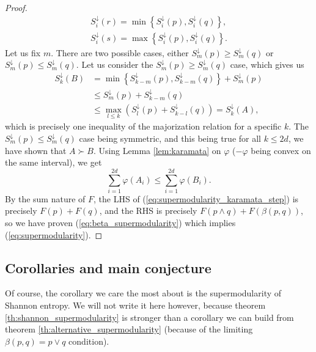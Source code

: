 \begin{proof}
    \begin{gather}
        S^\downarrow_i (r) = \min \left\{S^\downarrow_i (p), S^\downarrow_i (q)\right\}, \\
        S^\downarrow_i (s) = \max \left\{S^\downarrow_i (p), S^\downarrow_i (q)\right\}.
    \end{gather} 
    Let us fix $m$. There are two possible cases, either $S^\downarrow_m (p) \geq S^\downarrow_m (q)$ or $S^\downarrow_m (p) \leq S^\downarrow_m (q)$. Let us consider the $S^\downarrow_m (p) \geq S^\downarrow_m (q)$ case, which gives us
    \begin{align}
        S^\downarrow_k (B) &= \min \left\{S^\downarrow_{k-m} (p), S^\downarrow_{k-m} (q)\right\} + S^\downarrow_m (p) \\
        &\leq S^\downarrow_m (p) + S^\downarrow_{k-m} (q) \\
        &\leq \max_{l\leq k} \left(S^\downarrow_l (p) +S^\downarrow_{k-l} (q)\right) = S^\downarrow_k (A),
    \end{align}
    which is precisely one inequality of the majorization relation for a specific $k$. The $S^\downarrow_m (p) \leq S^\downarrow_m (q)$ case being symmetric, and this being true for all $k \leq 2d$, we have shown that $A \succ B$.
    Using Lemma \ref{lem:karamata} on $\varphi$ ($-\varphi$ being convex on the same interval), we get
    \begin{equation} \label{eq:supermodularity_karamata_step}
        \sum_{i=1}^{2d} \varphi(A_i) \leq \sum_{i=1}^{2d} \varphi(B_i).
    \end{equation}
    By the sum nature of $F$, the LHS of (\ref{eq:supermodularity_karamata_step}) is precisely $F(p) + F(q)$, and the RHS is precisely $F(p \wedge q) + F(\beta(p, q))$, so we have proven (\ref{eq:beta_supermodularity}) which implies (\ref{eq:supermodularity}). \qedhere
\end{proof}

\subsection{Corollaries and main conjecture}

Of course, the corollary we care the most about is the supermodularity of Shannon entropy. We will not write it here however, because theorem \ref{th:shannon_supermodularity} is stronger than a corollary we can build from theorem \ref{th:alternative_supermodularity} (because of the limiting $\beta(p, q) = p \vee q$ condition).

